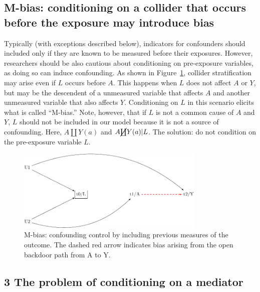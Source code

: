 \documentclass[
  singlecolumn]{report}
\begin{document}
\hypertarget{m-bias-conditioning-on-a-collider-that-occurs-before-the-exposure-may-introduce-bias}{%
\subsection{M-bias: conditioning on a collider that occurs before the
exposure may introduce
bias}\label{m-bias-conditioning-on-a-collider-that-occurs-before-the-exposure-may-introduce-bias}}

Typically (with exceptions described below), indicators for confounders
should included only if they are known to be measured before their
exposures. However, researchers should be also cautious about
conditioning on pre-exposure variables, as doing so can induce
confounding. As shown in Figure~\ref{fig-m-bias}, collider
stratification may arise even if \(L\) occurs before \(A\). This happens
when \(L\) does not affect \(A\) or \(Y\), but may be the descendent of
a unmeasured variable that affects \(A\) and another unmeasured variable
that also affects \(Y\). Conditioning on \(L\) in this scenario elicits
what is called ``M-bias.'' Note, however, that if \(L\) is not a common
cause of \(A\) and \(Y\), \(L\) should not be included in our model
because it is not a source of confounding. Here, \(A \coprod Y(a)\) and
\(A \cancel{\coprod} Y(a)| L\). The solution: do not condition on the
pre-exposure variable \(L\).

\begin{figure}

{\centering \includegraphics[width=0.8\textwidth,height=\textheight]{causal-dags_files/figure-pdf/fig-m-bias-1.pdf}

}

\caption{\label{fig-m-bias}M-bias: confounding control by including
previous measures of the outcome. The dashed red arrow indicates bias
arising from the open backdoor path from A to Y.}

\end{figure}

\hypertarget{the-problem-of-conditioning-on-a-mediator}{%
\subsection{3 The problem of conditioning on a
mediator}\label{the-problem-of-conditioning-on-a-mediator}}
\end{document}
